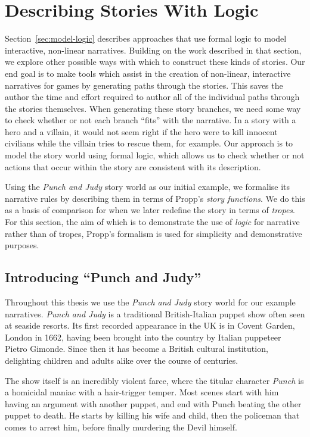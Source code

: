 \documentclass[11pt]{report}
\begin{document}
\section{Describing Stories With Logic}
\label{sec:stories-logic}
Section~\ref{sec:model-logic} describes approaches that use formal logic to model interactive, non-linear narratives. Building on the work described in that section, we explore other possible ways with which to construct these kinds of stories.
Our end goal is to make tools which assist in the creation of non-linear,
interactive narratives for games by generating paths through the stories. This
saves the author the time and effort required to author all of the individual
paths through the stories themselves. When generating these story branches, we
need some way to check whether or not each branch ``fits'' with the narrative.
In a story with a hero and a villain, it would not seem right if the hero were
to kill innocent civilians while the villain tries to rescue them, for example.
Our approach is to model the story world using formal logic, which allows us to
check whether or not actions that occur within the story are consistent with its description.

Using the \emph{Punch and Judy} story world as our initial example, we formalise
its narrative rules by describing them in terms of Propp's \emph{story
  functions}. We do this as a basis of comparison for when we later redefine the
story in terms of \emph{tropes}. For this section, the aim of which is to demonstrate the use of
\emph{logic} for narrative rather than of tropes, Propp's formalism is used for
simplicity and demonstrative purposes.

\subsection{Introducing ``Punch and Judy''}
Throughout this thesis we use the \emph{Punch and Judy} story world for our
example narratives. \emph{Punch and Judy} is a traditional British-Italian
puppet show often seen at seaside resorts. Its first recorded appearance in the
UK is in Covent Garden, London in 1662, having been brought into the country by
Italian puppeteer Pietro Gimonde. Since then it has become a British cultural
institution, delighting children and adults alike over the course of centuries.

The show itself is an incredibly violent farce, where the titular character
\emph{Punch} is a homicidal maniac with a hair-trigger temper. Most scenes start
with him having an argument with another puppet, and end with Punch beating the
other puppet to death. He starts by killing his wife and child, then the
policeman that comes to arrest him, before finally murdering the Devil himself.
\end{document}
